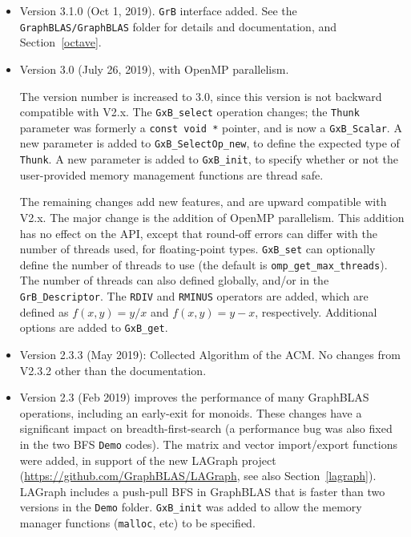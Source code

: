 \begin{itemize}
    \verb'GrB' interface modified:  \verb'GrB.init' is now required.

\item Version 3.1.0 (Oct 1, 2019).  \verb'GrB' interface added.  See the
    \newline \verb'GraphBLAS/GraphBLAS' folder for details and documentation,
    and Section~\ref{octave}.

\item Version 3.0 (July 26, 2019), with OpenMP parallelism.

The version number is increased to 3.0, since
this version is not backward compatible with V2.x.  The \verb'GxB_select'
operation changes; the \verb'Thunk' parameter was formerly a
\verb'const void *' pointer, and is now a \verb'GxB_Scalar'.  A new parameter
is added to \verb'GxB_SelectOp_new', to define the expected type of
\verb'Thunk'.  A new parameter is added to \verb'GxB_init', to specify whether
or not the user-provided memory management functions are thread safe.

The remaining changes add new features, and are upward compatible with V2.x.
The major change is the addition of OpenMP parallelism.  This addition has no
effect on the API, except that round-off errors can differ with the number of
threads used, for floating-point types.  \verb'GxB_set' can optionally define
the number of threads to use (the default is \verb'omp_get_max_threads').  The
number of threads can also defined globally, and/or in the
\verb'GrB_Descriptor'.  The \verb'RDIV' and \verb'RMINUS' operators are added,
which are defined as $f(x,y)=y/x$ and $f(x,y)=y-x$, respectively.  Additional
options are added to \verb'GxB_get'.

\item Version 2.3.3 (May 2019): Collected Algorithm of the ACM.
No changes from V2.3.2 other than the documentation.

\item Version 2.3 (Feb 2019) improves the performance of many GraphBLAS
operations, including an early-exit for monoids.  These changes have a
significant impact on breadth-first-search (a performance bug was also fixed in
the two BFS \verb'Demo' codes).  The matrix and vector import/export functions
were added, in support of the new LAGraph project
(\url{https://github.com/GraphBLAS/LAGraph}, see also Section~\ref{lagraph}).
LAGraph includes a push-pull BFS in GraphBLAS that is faster than two versions
in the \verb'Demo' folder.  \verb'GxB_init' was added to allow the memory
manager functions (\verb'malloc', etc) to be specified.


\end{itemize}
